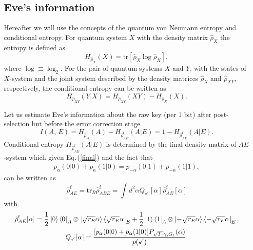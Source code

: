 \documentclass[a4paper]{article}
\newcommand{\tr}{\text{tr}}
\begin{document}
\subsection{Eve's information}
Hereafter we will use the concepts of the quantum von Neumann entropy and conditional entropy.
For quantum system $X$ with the density matrix $\hat\rho_X$ the entropy is defined as
%
\begin{equation}
    H_{\hat\rho_X}(X)=\tr\left[\hat\rho_X \log \hat\rho_X\right],
\end{equation}
%
where $\log\equiv\log_2$.
For the pair of quantum systems $X$ and $Y$, with the states of $X$-system and the joint system described by the density matrices $\hat\rho_X$ and $\hat\rho_{XY}$, respectively, the conditional entropy can be written as
%
\begin{equation}
    H_{\hat\rho_{XY}}(Y|X)=H_{\hat\rho_{XY}}(XY)-H_{\hat\rho_{X}}(X).
\end{equation}
%


Let us estimate Eve's information about the raw key (per 1 bit) after post-selection but before the error correction stage
\begin{equation}
\label{iae}
    I(A,\,E) = H_{\hat{\rho}^{\text{f}}_{A}}(A)-H_{\hat{\rho}^{\text{f}}_{AE}}(A|E) = 1 - H_{\hat{\rho}^{\text{f}}_{AE}}(A|E).
\end{equation}
Conditional entropy $H_{\hat{\rho}^{\text{f}}_{AE}}(A|E)$ is determined by the final density matrix of $AE$-system which given Eq.\,(\ref{final}) and the fact that 
%
\begin{equation}
\begin{gathered}
   p_{\alpha}(0 | 0) + p_{\alpha}(1 | 0) = p_{-\alpha}(0 | 1)+p_{-\alpha}(1 | 1),
\end{gathered}
\end{equation}
%
can be written as
\begin{equation}
    \hat{\rho}^{\text{f}}_{AE} =\tr_B\hat{\rho}^{\text{f}}_{ABE} =  \int d^2 \alpha Q_{\checkmark}[\alpha]\hat{\rho}^{\text{f}}_{AE}[\alpha] 
\end{equation}
with
\begin{equation}
\begin{gathered}
    \hat{\rho}^{\text{f}}_{AE}[\alpha] = \frac{1}{2}\ket{0}\bra{0}_{A} \otimes\ket{\sqrt{r_E}\alpha}\bra{\sqrt{r_E}\alpha}_E + \frac{1}{2}\ket{1}\bra{1}_{A} \otimes\ket{-\sqrt{r_E}\alpha}\bra{-\sqrt{r_E}\alpha}_E,\\
    Q_{\checkmark}[\alpha] = \frac{[p_{\alpha}(0 | 0) + p_{\alpha}(1 | 0)]P_{\sqrt{T_1}\gamma, G_1}(\alpha)}{p(\checkmark)}.
\end{gathered}
\end{equation}
\end{document}
